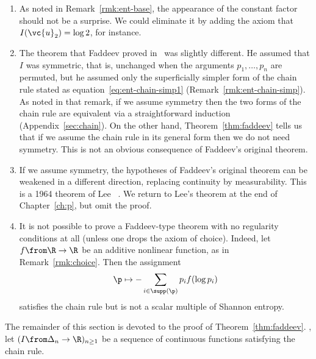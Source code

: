 \begin{remarks}
\begin{enumerate}
\item 
As noted in Remark~\ref{rmk:ent-base}, the appearance of the constant
factor should not be a surprise.  We could eliminate it by adding the axiom
that $I(\vc{u}_2) = \log 2$, for instance.

\item
{} 
% 
The theorem that Faddeev proved
in~\cite{Fadd} was slightly different.  He assumed that $I$ was symmetric,
that is, unchanged when the arguments $p_1, \ldots, p_n$ are permuted, but
he assumed only the superficially simpler form of the chain rule stated as
equation~\eqref{eq:ent-chain-simp1} (Remark~\ref{rmk:ent-chain-simp}).  As
noted in that remark, if we assume symmetry then the two forms
of the chain rule are equivalent via a straightforward induction
(Appendix~\ref{sec:chain}).  On the other hand, Theorem~\ref{thm:faddeev}
tells us that if we assume the chain rule in its general form then we do
not need symmetry.  This is not an obvious consequence of Faddeev's
original theorem.

\item
{}
If we assume symmetry, the hypotheses of Faddeev's original theorem can be
weakened in a different direction, replacing
continuity by measurability.%
% 
% 
This is a 1964 theorem of Lee~\cite{Lee}%
%
.
%
We return to Lee's theorem at the end of
Chapter~\ref{ch:p}, but omit the proof.  

\item
{}
It is not possible to prove a Faddeev-type theorem with no regularity
conditions at all (unless one drops the axiom of choice).  Indeed, let $f
\from \R \to \R$ be an additive nonlinear function, as in
Remark~\ref{rmk:choice}.  Then the assignment
\[
\p \mapsto - \sum_{i \in \supp(\p)} p_i f(\log p_i)
\]
satisfies the chain rule but is not a scalar multiple of Shannon
entropy. 
\end{enumerate}
\end{remarks}

The remainder of this section is devoted to the proof of
Theorem~\ref{thm:faddeev}.  , let $(I
\from \Delta_n \to \R)_{n \geq 1}$ be a sequence of continuous functions
satisfying the chain rule.

